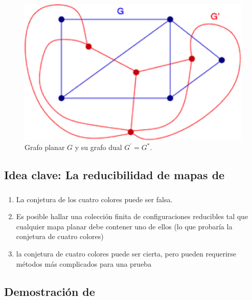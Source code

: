 \documentclass[spanish,utf8]{beamer}
\theoremstyle{definition}
\begin{document}
\begin{frame}[allowframebreaks]
\begin{figure}[H]
	\captionsetup{justification=centering,margin=0.5cm}
	\centering
	\includegraphics{example3.png}
	\caption{Grafo planar $G$ y	su grafo dual $G^{\prime}=G^{\ast}$.}
\end{figure}

\end{frame}

\subsection{Idea clave: La reducibilidad de mapas de \citeauthor{birkhoff}}

\begin{frame}
\frametitle{\insertsubsection}
\begin{theorem}
\begin{enumerate}\normalfont
	\item La conjetura de los cuatro colores puede ser falsa.
	
	\item Es posible hallar una colección finita de configuraciones reducibles tal que cualquier mapa planar debe contener uno de ellos (lo que probaría la conjetura de cuatro colores)
	
	\item la conjetura de cuatro colores puede ser cierta, pero pueden requerirse métodos más complicados para una prueba
\end{enumerate}
\end{theorem}
\end{frame}

\subsection{Demostración de \citeauthor{appel}}
\end{document}
